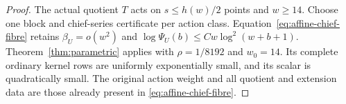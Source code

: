 \begin{proof}
The actual quotient $T$ acts on $s\leq h(w)/2$ points and
$w\geq14$. Choose one block and chief-series certificate per
action class. Equation~\eqref{eq:affine-chief-fibre} retains
$\beta_U=o(w^2)$ and $\log\Psi_U(b)\leq Cw\log^2(w+b+1)$.
Theorem~\ref{thm:parametric} applies with
$\rho=1/8192$ and $w_0=14$. Its complete ordinary kernel rows
are uniformly exponentially small, and its scalar is quadratically small.
The original action weight
and all quotient and extension data are those already present in
\eqref{eq:affine-chief-fibre}.
\end{proof}
